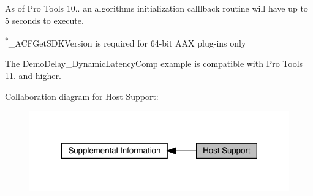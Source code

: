 \begin{DoxyRefList}
\label{a00786__compatibility_notes000010}%
%
 
\item[Module \mbox{\hyperlink{a00797}{Common\+Interface\+\_\+\+Algorithm}} ]\label{a00786__compatibility_notes000002}%
%
 As of Pro Tools 10.. an algorithm\textquotesingle{}s initialization calllback routine will have up to 5 seconds to execute. 
\item[Module \mbox{\hyperlink{a00801}{Common\+Interface\+\_\+\+Format\+Specification}} ]\label{a00786__compatibility_notes000003}%
%


\label{a00786__compatibility_notes000004}%
%


\label{a00786__compatibility_notes000005}%
%


\label{a00786__compatibility_notes000006}%
%
 \textsuperscript{$\ast$}{\ttfamily \+\_\+\+A\+C\+F\+Get\+S\+D\+K\+Version} is required for 64-\/bit A\+AX plug-\/ins only 
\item[Module \mbox{\hyperlink{a00848}{Example\+Plug\+Ins}} ]\label{a00786__compatibility_notes000011}%
%
 The Demo\+Delay\+\_\+\+Dynamic\+Latency\+Comp example is compatible with Pro Tools 11. and higher.
\end{DoxyRefList}Collaboration diagram for Host Support\+:
\nopagebreak
\begin{figure}[H]
\begin{center}
\leavevmode
\includegraphics[width=320pt]{a00845}
\end{center}
\end{figure}
